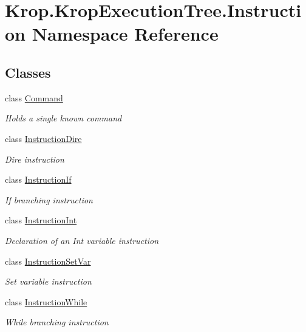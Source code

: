 \hypertarget{namespace_krop_1_1_krop_execution_tree_1_1_instruction}{}\section{Krop.\+Krop\+Execution\+Tree.\+Instruction Namespace Reference}
\label{namespace_krop_1_1_krop_execution_tree_1_1_instruction}
\subsection*{Classes}
\begin{DoxyCompactItemize}
\item 
class \mbox{\hyperlink{class_krop_1_1_krop_execution_tree_1_1_instruction_1_1_command}{Command}}
\begin{DoxyCompactList}\small\item\em Holds a single known command \end{DoxyCompactList}\item 
class \mbox{\hyperlink{class_krop_1_1_krop_execution_tree_1_1_instruction_1_1_instruction_dire}{Instruction\+Dire}}
\begin{DoxyCompactList}\small\item\em Dire instruction \end{DoxyCompactList}\item 
class \mbox{\hyperlink{class_krop_1_1_krop_execution_tree_1_1_instruction_1_1_instruction_if}{Instruction\+If}}
\begin{DoxyCompactList}\small\item\em If branching instruction \end{DoxyCompactList}\item 
class \mbox{\hyperlink{class_krop_1_1_krop_execution_tree_1_1_instruction_1_1_instruction_int}{Instruction\+Int}}
\begin{DoxyCompactList}\small\item\em Declaration of an Int variable instruction \end{DoxyCompactList}\item 
class \mbox{\hyperlink{class_krop_1_1_krop_execution_tree_1_1_instruction_1_1_instruction_set_var}{Instruction\+Set\+Var}}
\begin{DoxyCompactList}\small\item\em Set variable instruction \end{DoxyCompactList}\item 
class \mbox{\hyperlink{class_krop_1_1_krop_execution_tree_1_1_instruction_1_1_instruction_while}{Instruction\+While}}
\begin{DoxyCompactList}\small\item\em While branching instruction \end{DoxyCompactList}\end{DoxyCompactItemize}
